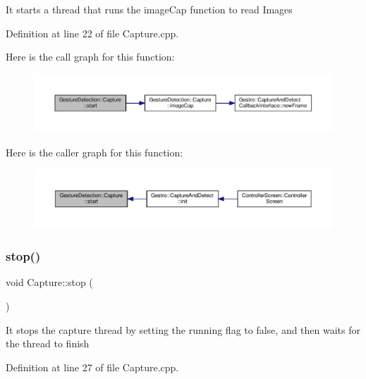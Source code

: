 It starts a thread that runs the image\+Cap function to read Images 

Definition at line 22 of file Capture.\+cpp.

Here is the call graph for this function\+:
\nopagebreak
\begin{figure}[H]
\begin{center}
\leavevmode
\includegraphics[width=350pt]{class_gesture_detection_1_1_capture_a2ffe4eeac4caa296f4fcc75cc82c1436_cgraph}
\end{center}
\end{figure}
Here is the caller graph for this function\+:
\nopagebreak
\begin{figure}[H]
\begin{center}
\leavevmode
\includegraphics[width=350pt]{class_gesture_detection_1_1_capture_a2ffe4eeac4caa296f4fcc75cc82c1436_icgraph}
\end{center}
\end{figure}
\mbox{\label{class_gesture_detection_1_1_capture_ab632f1927461a909b18cce71ec96f76d}} 
\subsubsection{\texorpdfstring{stop()}{stop()}}
{\footnotesize\ttfamily void Capture\+::stop (\begin{DoxyParamCaption}{ }\end{DoxyParamCaption})}

It stops the capture thread by setting the running flag to false, and then waits for the thread to finish 

Definition at line 27 of file Capture.\+cpp.



